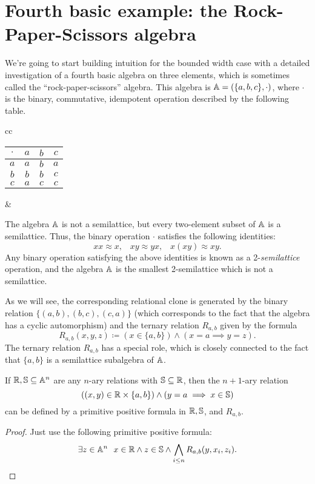 \documentclass[letterpaper,11pt]{article}
\begin{document}
\section{Fourth basic example: the Rock-Paper-Scissors algebra}\label{s-rps}

We're going to start building intuition for the bounded width case with a detailed investigation of a fourth basic algebra on three elements, which is sometimes called the ``rock-paper-scissors'' algebra. This algebra is $\mathbb{A} = (\{a,b,c\}, \cdot)$, where $\cdot$ is the binary, commutative, idempotent operation described by the following table.
\begin{center}
\begin{tabular}{cc}%
\begin{tabular}{c|ccc} $\cdot$ & $a$ & $b$ & $c$\\ \hline $a$ & $a$ & $b$ & $a$\\ $b$ & $b$ & $b$ & $c$\\ $c$ & $a$ & $c$ & $c$\end{tabular} & 
\end{tabular}
\end{center}
The algebra $\mathbb{A}$ is not a semilattice, but every two-element subset of $\mathbb{A}$ is a semilattice. Thus, the binary operation $\cdot$ satisfies the following identities:
\[
xx \approx x, \;\;\; xy \approx yx, \;\;\; x(xy) \approx xy.
\]
Any binary operation satisfying the above identities is known as a 2-\emph{semilattice} operation, and the algebra $\mathbb{A}$ is the smallest 2-semilattice which is not a semilattice.

As we will see, the corresponding relational clone is generated by the binary relation $\{(a,b), (b,c), (c,a)\}$ (which corresponds to the fact that the algebra has a cyclic automorphism) and the ternary relation $R_{a,b}$ given by the formula
\[
R_{a,b}(x,y,z) \coloneqq (x \in \{a,b\}) \wedge (x = a \implies y = z).
\]
The ternary relation $R_{a,b}$ has a special role, which is closely connected to the fact that $\{a,b\}$ is a semilattice subalgebra of $\mathbb{A}$.

\begin{prop} If $\mathbb{R}, \mathbb{S} \subseteq \mathbb{A}^n$ are any $n$-ary relations with $\mathbb{S} \subseteq \mathbb{R}$, then the $n+1$-ary relation
\[
((x,y) \in \mathbb{R}\times \{a,b\}) \wedge (y = a \implies x \in \mathbb{S})
\]
can be defined by a primitive positive formula in $\mathbb{R},\mathbb{S}$, and $R_{a,b}$.
\end{prop}
\begin{proof} Just use the following primitive positive formula:
\[
\exists z \in \mathbb{A}^n\ \ x \in \mathbb{R} \wedge z \in \mathbb{S} \wedge \bigwedge_{i \le n} R_{a,b}(y,x_i,z_i).\qedhere
\]
\end{proof}
\end{document}
